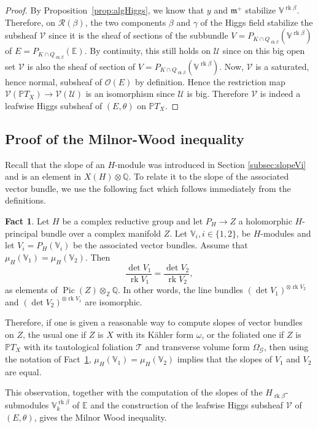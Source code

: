 \documentclass[JEP,XML,SOM,Unicode,NoFloatCountersInSection]{cedram}
\let\mathcal\mathscr
\theoremstyle{plain}
\theoremstyle{definition}
\newtheorem{fact}[theo]{Fact}
\DeclareMathOperator{\Pic}{Pic}
\DeclareMathOperator{\rk}{rk}
\newcommand{\cG}{\mathcal{G}}
\newcommand{\cO}{\mathcal{O}}
\newcommand{\cR}{\mathcal{R}}
\newcommand{\cT}{\mathcal{T}}
\newcommand{\cU}{\mathcal{U}}
\newcommand{\cV}{\mathcal{V}}
\newcommand{\bE}{\mathbb{E}}
\newcommand{\bV}{\mathbb{V}}
\newcommand{\bZ}{\mathbb{Z}}
\newcommand{\bQ}{\mathbb{Q}}
\newcommand{\PTX}{{\mathbb{P}T_X}}
\newcommand{\Vb}{\mathbb{V}^{\rgb}}
\newcommand{\fm}{\mathfrak{m}}
\newcommand{\rgb}{{\rk\beta}}
\begin{document}
\begin{proof}
By Proposition~\ref{prop:algHiggs}, we know that $y$ and $\fm^+$ stabilize
$\Vb$. Therefore, on $\cR(\beta)$, the two components $\beta$ and $\gamma$ of the Higgs field
stabilize the subsheaf $\cV$ since it is the
sheaf of sections of the subbundle $V=P_{K\cap Q_\rgb}(\Vb)$
of $ E=P_{K\cap Q_\rgb}(\bE)$. By continuity, this still holds on $\cU$ since on this big open set
$\cV$ is also the sheaf of section of $V=P_{K\cap Q_\rgb}(\Vb)$.
Now, $\cV$ is a saturated, hence normal, subsheaf of
$\cO(E)$ by definition. Hence the restriction map $\cV(\PTX)\to \cV(\cU)$ is an isomorphism
since $\cU$ is big. Therefore $\cV$ is indeed a leafwise Higgs subsheaf of
$(E,\theta)$ on $\PTX$.
\end{proof}

\subsection{Proof of the Milnor-Wood inequality}\label{subsec:proofMW}

Recall that the slope of an $H$-module was introduced in Section \ref{subsec:slopeVi} and is
an element in $X(H) \otimes \bQ$. To relate it to the slope of the
associated vector bundle, we use the following fact which follows immediately from the definitions.

\begin{fact}
\label{fact:slopes}
Let $H$ be a complex reductive group and let $P_H \to Z$ a holomorphic $H$-principal bundle over a
complex manifold $Z$.
Let $\bV_i,i \in \{1,2\}$, be $H$-modules and let $V_i=P_H(\bV_i)$ be the associated vector bundles.
Assume that $\mu_H(\bV_1)=\mu_H(\bV_2)$. Then
$$ \frac{\det V_1}{\rk V_1} = \frac{\det V_2}{\rk V_2 }, $$
as elements of $\Pic(Z) \otimes_\bZ \bQ$. In other words, the line bundles
$(\det V_1)^{\otimes\rk V_2}$ and $(\det V_2)^{\otimes\rk V_1}$ are isomorphic.
\end{fact}

Therefore, if one is given a reasonable way to compute slopes of vector
bundles on
$Z$, \eg the usual one if $Z$ is $X$ with its Kähler form $\omega$,
or the foliated one if $Z$ is $\PTX$ with its tautological foliation $\cT$ and transverse
volume form
$\Omega_{\cG}$, then using the notation of Fact~\ref{fact:slopes}, $\mu_H(\bV_1)=\mu_H(\bV_2)$ implies
that the slopes of $V_1$ and $V_2$
are equal.

This observation, together with the computation of the slopes of the $H_\rgb$-submodules $\Vb_k$ of
$\bE$ and the construction of the leafwise Higgs subsheaf $\cV$ of $(E,\theta)$,
gives the Milnor Wood inequality.
\end{document}

